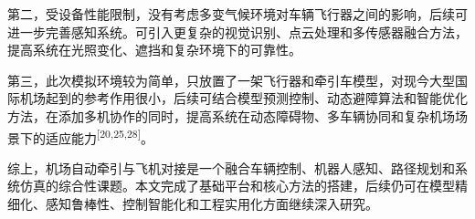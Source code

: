 第二，受设备性能限制，没有考虑多变气候环境对车辆飞行器之间的影响，后续可进一步完善感知系统。可引入更复杂的视觉识别、点云处理和多传感器融合方法，提高系统在光照变化、遮挡和复杂环境下的可靠性。

第三，此次模拟环境较为简单，只放置了一架飞行器和牵引车模型，对现今大型国际机场起到的参考作用很小，后续可结合模型预测控制、动态避障算法和智能优化方法，在添加多机协作的同时，提高系统在动态障碍物、多车辆协同和复杂机场场景下的适应能力\textsuperscript{[20,25,28]}。

综上，机场自动牵引与飞机对接是一个融合车辆控制、机器人感知、路径规划和系统仿真的综合性课题。本文完成了基础平台和核心方法的搭建，后续仍可在模型精细化、感知鲁棒性、控制智能化和工程实用化方面继续深入研究。
